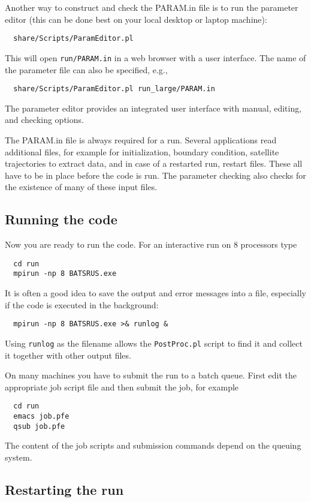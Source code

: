Another way to construct and check the PARAM.in file is to run the parameter editor
(this can be done best on your local desktop or laptop machine):
\begin{verbatim}
  share/Scripts/ParamEditor.pl
\end{verbatim}
This will open {\tt run/PARAM.in} in a web browser with a user interface.
The name of the parameter file can also be specified, e.g., 
\begin{verbatim}
  share/Scripts/ParamEditor.pl run_large/PARAM.in
\end{verbatim}
The parameter editor provides an integrated user interface with manual, 
editing, and checking options.

The PARAM.in file is always required for a run. Several applications read additional files,
for example for initialization, boundary condition, satellite trajectories to extract data, 
and in case of a restarted run, restart files. These all have to be in place before
the code is run. The parameter checking also checks for the existence of many of these
input files.

\subsection{Running the code}

Now you are ready to run the code. For an interactive run 
on 8 processors type
\begin{verbatim}
  cd run
  mpirun -np 8 BATSRUS.exe
\end{verbatim}
It is often a good idea to save the output and error messages into a file, especially if the code
is executed in the background:
\begin{verbatim}
  mpirun -np 8 BATSRUS.exe >& runlog &
\end{verbatim}
Using {\tt runlog} as the filename allows the {\tt PostProc.pl} script
to find it and collect it together with other output files.

On many machines you have to submit the run to a batch queue.
First edit the appropriate job script file and then submit the job,
for example
\begin{verbatim}
  cd run
  emacs job.pfe
  qsub job.pfe
\end{verbatim}
The content of the job scripts and submission commands depend on
the queuing system. 

\subsection{Restarting the run}

